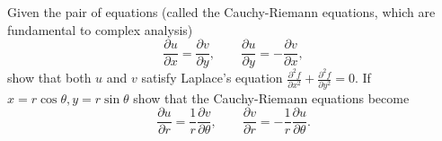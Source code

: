 \documentclass[answers]{exam}
\begin{document}
\begin{questions}
\question%
Given the pair of equations (called the Cauchy-Riemann equations, which are fundamental to complex analysis) \[
	\frac{\partial u}{\partial x}=\frac{\partial v}{\partial y},\qquad
	\frac{\partial u}{\partial y}=-\frac{\partial v}{\partial x},
\] show that both $u$ and $v$ satisfy Laplace's equation $\frac{\partial^2f}{\partial x^2}+\frac{\partial^2f}{\partial y^2}=0$. If $x=r \cos \theta, y=r \sin \theta$ show that the Cauchy-Riemann equations become \[
	\frac{\partial u}{\partial r}=\frac1r\frac{\partial v}{\partial\theta},\qquad
	\frac{\partial v}{\partial r}=-\frac1r\frac{\partial u}{\partial\theta}.
\]

\end{questions}
\end{document}

